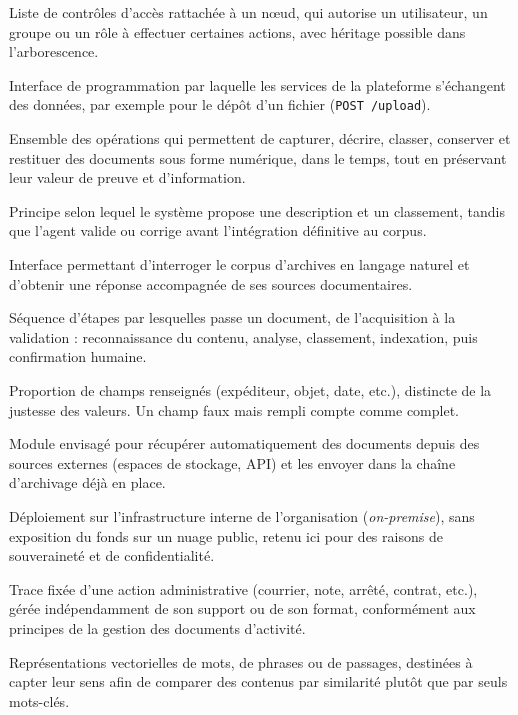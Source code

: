 \documentclass[12pt,a4paper]{report}
\begin{document}
\begin{description}[style=unboxed, leftmargin=0pt, itemsep=0.55em, parsep=0.12em, font=\normalfont\bfseries]
  \item[ACL (\textit{Access Control List})] Liste de contrôles d'accès rattachée à un nœud, qui autorise un utilisateur, un groupe ou un rôle à effectuer certaines actions, avec héritage possible dans l'arborescence.
  \item[API (\textit{Application Programming Interface})] Interface de programmation par laquelle les services de la plateforme s'échangent des données, par exemple pour le dépôt d'un fichier (\texttt{POST /upload}).
  \item[archivage numérique] Ensemble des opérations qui permettent de capturer, décrire, classer, conserver et restituer des documents sous forme numérique, dans le temps, tout en préservant leur valeur de preuve et d'information.
  \item[assistance contrôlée] Principe selon lequel le système propose une description et un classement, tandis que l'agent valide ou corrige avant l'intégration définitive au corpus.
  \item[assistant conversationnel] Interface permettant d'interroger le corpus d'archives en langage naturel et d'obtenir une réponse accompagnée de ses sources documentaires.
  \item[chaîne de traitement] Séquence d'étapes par lesquelles passe un document, de l'acquisition à la validation : reconnaissance du contenu, analyse, classement, indexation, puis confirmation humaine.
  \item[complétude] Proportion de champs renseignés (expéditeur, objet, date, etc.), distincte de la justesse des valeurs. Un champ faux mais rempli compte comme complet.
  \item[connecteur] Module envisagé pour récupérer automatiquement des documents depuis des sources externes (espaces de stockage, API) et les envoyer dans la chaîne d'archivage déjà en place.
  \item[déploiement sur site] Déploiement sur l'infrastructure interne de l'organisation (\textit{on-premise}), sans exposition du fonds sur un nuage public, retenu ici pour des raisons de souveraineté et de confidentialité.
  \item[document d'activité] Trace fixée d'une action administrative (courrier, note, arrêté, contrat, etc.), gérée indépendamment de son support ou de son format, conformément aux principes de la gestion des documents d'activité.
  \item[embeddings] Représentations vectorielles de mots, de phrases ou de passages, destinées à capter leur sens afin de comparer des contenus par similarité plutôt que par seuls mots-clés.

\end{description}
\end{document}
